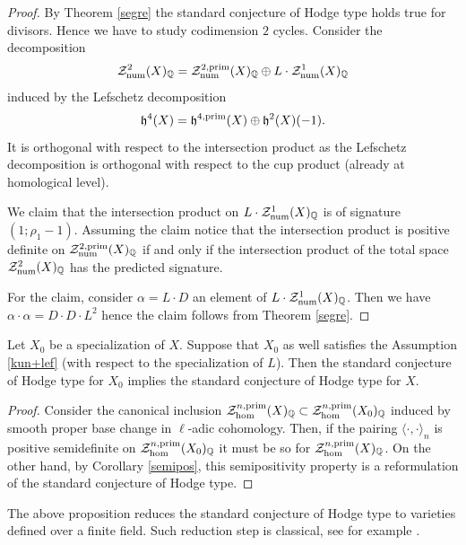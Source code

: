 \begin{proof}
By Theorem \ref{segre} the standard conjecture of Hodge type holds true for divisors.  Hence we have to study codimension $2$ cycles.
Consider the decomposition \[\mathcal{Z}^{2}_{\mathrm{num}}(X)_{\mathbb{Q}} = \mathcal{Z}^{2,\mathrm{prim}}_{\mathrm{num}}(X)_{\mathbb{Q}} \oplus L \cdot \mathcal{Z}^{1}_{\mathrm{num}}(X)_{\mathbb{Q}}\] induced by the Lefschetz decomposition \[\mathfrak{h}^{4}(X)=\mathfrak{h}^{4,\mathrm{prim}}(X) \oplus \mathfrak{h}^{2}(X)(-1).\]  It is orthogonal with respect to the intersection product as the Lefschetz decomposition is orthogonal with respect to the cup product (already at homological level).

We claim that the intersection product on  $L \cdot \mathcal{Z}^{1}_{\mathrm{num}}(X)_{\mathbb{Q}}$ is of signature $(1;  \rho_1-1)$. Assuming the claim notice that  the intersection product is positive definite on $\mathcal{Z}^{2,\mathrm{prim}}_{\mathrm{num}}(X)_{\mathbb{Q}}$ if and only if the intersection product of the total space $\mathcal{Z}^2_{\mathrm{num}}(X)_{\mathbb{Q}}$ has the predicted signature.

For the claim, consider $\alpha=L \cdot D$ an element of $L \cdot \mathcal{Z}^{1}_{\mathrm{num}}(X)_{\mathbb{Q}}$. Then we have
$\alpha\cdot \alpha = D \cdot D \cdot L^2$
hence the claim follows from Theorem \ref{segre}.
\end{proof}
\begin{prop}
\notready \label{reducefinite}
Let $X_0$ be a specialization of $X$. Suppose that $X_0$ as well satisfies the Assumption \ref{kun+lef} (with respect to the specialization of $L$). Then the standard conjecture of Hodge type for $X_0$ implies the standard conjecture of Hodge type for $X$.
\end{prop}
\begin{proof} Consider the canonical inclusion  $\mathcal{Z}_{\hom}^{n,\mathrm{prim}}(X)_{\mathbb{Q}}\subset \mathcal{Z}_{\hom}^{n,\mathrm{prim}}(X_0)_{\mathbb{Q}}$ induced by smooth proper base change in $\ell$-adic cohomology. Then, if the pairing $\langle \cdot, \cdot \rangle_{n}$  is positive semidefinite  on $\mathcal{Z}_{\hom}^{n,\mathrm{prim}}(X_0)_{\mathbb{Q}}$ it must be so for  $\mathcal{Z}_{\hom}^{n,\mathrm{prim}}(X)_{\mathbb{Q}} $. On the other hand, by Corollary \ref{semipos}, this semipositivity property is a reformulation of the standard conjecture of Hodge type.
\end{proof}
\begin{remark}
\notready
The above proposition reduces the standard conjecture of Hodge type to varieties defined over a finite field. Such reduction step is classical, see for example \cite[Remark 5.3.2.2(2)]{Andmot}.
\end{remark}

